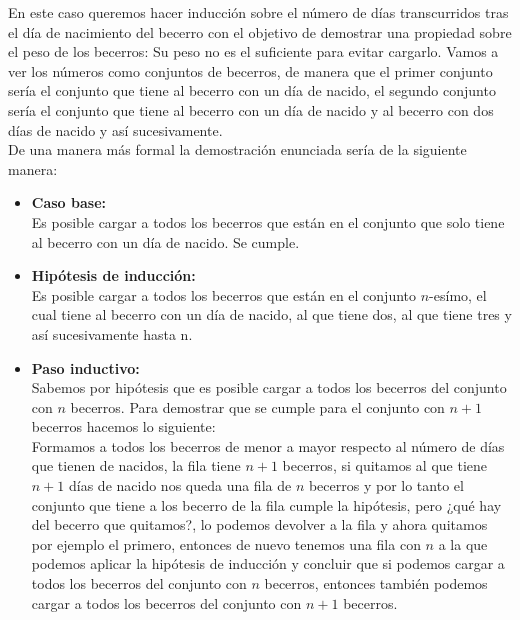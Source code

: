 \documentclass[spanish,12pt,letterpaper]{article}
\begin{document}
\noindent En este caso queremos hacer inducción sobre el número de días transcurridos tras el día de nacimiento del becerro con el objetivo de
demostrar una propiedad sobre el peso de los becerros: Su
peso no es el suficiente para evitar cargarlo. Vamos a ver los números como
conjuntos de becerros, de manera que el primer conjunto sería el conjunto que
tiene al becerro con un día de nacido, el segundo conjunto sería el conjunto
que tiene al becerro con un día de nacido y al becerro con dos días de nacido y
así sucesivamente.\\
De una manera más formal la demostración enunciada sería de la
siguiente manera:\\

\begin{itemize}
\item \textbf{Caso base:}\\
Es posible cargar a todos los becerros que están en el conjunto que solo tiene
al becerro con un día de nacido. Se cumple.

\item \textbf{Hipótesis de inducción:}\\
Es posible cargar a todos los becerros que están en el conjunto $n$-esímo, el
cual tiene al becerro con un día de nacido, al que tiene dos, al que tiene tres
y así sucesivamente hasta n.

\item \textbf{Paso inductivo:}\\
Sabemos por hipótesis que es posible cargar a todos los becerros del conjunto
con $n$ becerros. Para demostrar que se cumple para el conjunto con $n+1$
becerros hacemos lo siguiente:\\
Formamos a todos los becerros de menor a mayor respecto al número de días que
tienen de nacidos, la fila tiene $n+1$ becerros, si quitamos al que tiene
$n+1$ días de nacido nos queda una fila de $n$ becerros y por lo tanto el conjunto que tiene a los becerro de la fila cumple
la hipótesis, pero ¿qué hay del becerro que quitamos?, lo podemos devolver a la
fila y ahora quitamos por ejemplo el primero, entonces de nuevo
tenemos una fila con $n$ a la que podemos aplicar la hipótesis de inducción y
concluir que si podemos cargar a todos los becerros del conjunto con $n$
becerros, entonces también podemos cargar a todos los becerros del conjunto con
$n+1$ becerros.
\end{itemize}
\end{document}
